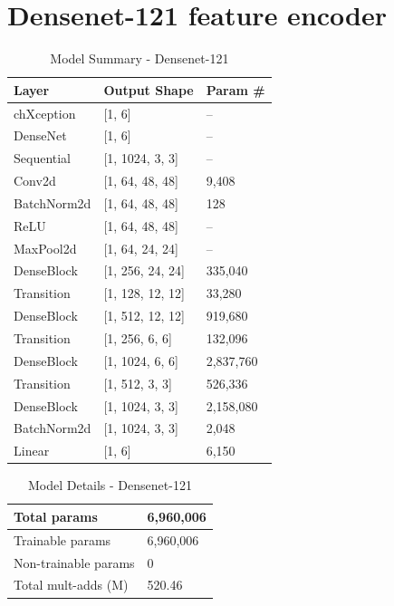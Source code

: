 \documentclass[12pt,DIV14,BCOR12mm,a4paper,footinclude=false,headinclude,parskip=half-,twoside,openright,cleardoublepage=empty,toc=index,bibliography=totoc,listof=totoc]{scrreprt}
\numberwithin{equation}{chapter}
\begin{document}
\section{Densenet-121 feature encoder}
\vspace{-0.5cm}
\begin{table}[H]
\caption{Model Summary - Densenet-121}
\centering
\begin{tabular}{|l|l|l|}
\hline
Layer & Output Shape & Param \# \\
\hline
chXception & [1, 6] & -- \\
\hline
\quad DenseNet & [1, 6] & -- \\
\quad\quad Sequential & [1, 1024, 3, 3] & -- \\
\quad\quad\quad Conv2d & [1, 64, 48, 48] & 9,408 \\
\quad\quad\quad BatchNorm2d & [1, 64, 48, 48] & 128 \\
\quad\quad\quad ReLU & [1, 64, 48, 48] & -- \\
\quad\quad\quad MaxPool2d & [1, 64, 24, 24] & -- \\
\quad\quad\quad DenseBlock & [1, 256, 24, 24] & 335,040 \\
\quad\quad\quad Transition & [1, 128, 12, 12] & 33,280 \\
\quad\quad\quad DenseBlock & [1, 512, 12, 12] & 919,680 \\
\quad\quad\quad Transition & [1, 256, 6, 6] & 132,096 \\
\quad\quad\quad DenseBlock & [1, 1024, 6, 6] & 2,837,760 \\
\quad\quad\quad Transition & [1, 512, 3, 3] & 526,336 \\
\quad\quad\quad DenseBlock & [1, 1024, 3, 3] & 2,158,080 \\
\quad\quad\quad BatchNorm2d & [1, 1024, 3, 3] & 2,048 \\
\quad\quad Linear & [1, 6] & 6,150 \\
\hline
\end{tabular}
\label{tab:densenet}
\end{table}
\vspace{-0.5cm}
\begin{table}[ht]
\caption{Model Details - Densenet-121}
\centering
\begin{tabular}{|l|l|}
\hline
Total params & 6,960,006 \\
\hline
Trainable params & 6,960,006 \\
\hline
Non-trainable params & 0 \\
\hline
Total mult-adds (M) & 520.46 \\
\hline
\end{tabular}
\label{tab:model_details_dense}
\end{table}
\end{document}
